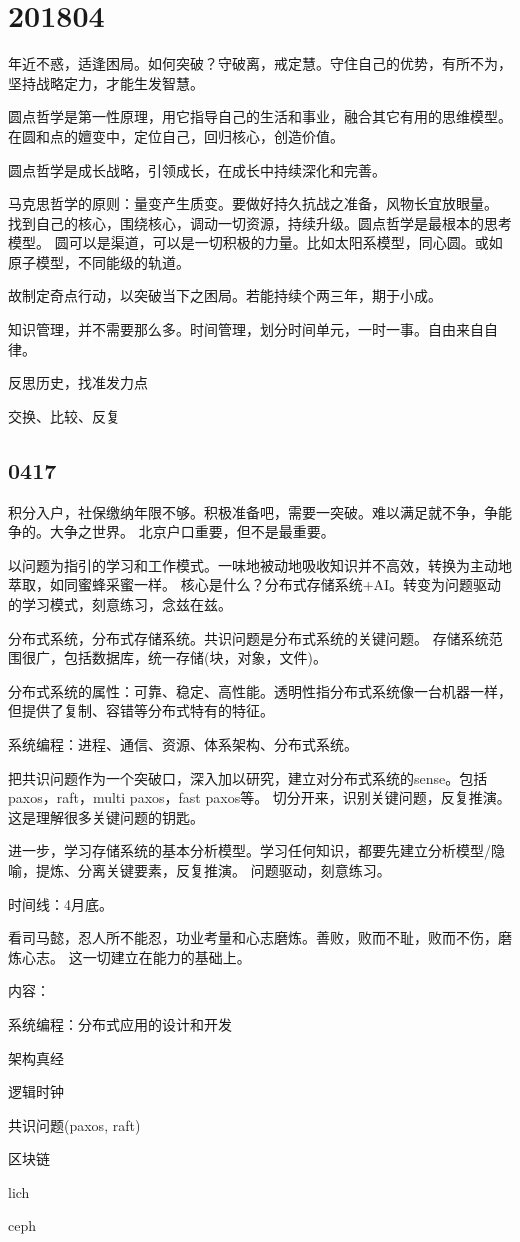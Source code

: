 \section{201804}

年近不惑，适逢困局。如何突破？守破离，戒定慧。守住自己的优势，有所不为，
坚持战略定力，才能生发智慧。

圆点哲学是第一性原理，用它指导自己的生活和事业，融合其它有用的思维模型。
在圆和点的嬗变中，定位自己，回归核心，创造价值。

圆点哲学是成长战略，引领成长，在成长中持续深化和完善。

马克思哲学的原则：量变产生质变。要做好持久抗战之准备，风物长宜放眼量。
找到自己的核心，围绕核心，调动一切资源，持续升级。圆点哲学是最根本的思考模型。
圆可以是渠道，可以是一切积极的力量。比如太阳系模型，同心圆。或如原子模型，不同能级的轨道。

故制定奇点行动，以突破当下之困局。若能持续个两三年，期于小成。

知识管理，并不需要那么多。时间管理，划分时间单元，一时一事。自由来自自律。

\begin{compactenum}
\item 反思历史，找准发力点
\item 交换、比较、反复
\end{compactenum}

\subsection{0417}

积分入户，社保缴纳年限不够。积极准备吧，需要一突破。难以满足就不争，争能争的。大争之世界。
北京户口重要，但不是最重要。

以问题为指引的学习和工作模式。一味地被动地吸收知识并不高效，转换为主动地萃取，如同蜜蜂采蜜一样。
核心是什么？分布式存储系统+AI。转变为问题驱动的学习模式，刻意练习，念兹在兹。

分布式系统，分布式存储系统。共识问题是分布式系统的关键问题。
存储系统范围很广，包括数据库，统一存储(块，对象，文件)。

分布式系统的属性：可靠、稳定、高性能。透明性指分布式系统像一台机器一样，但提供了复制、容错等分布式特有的特征。

系统编程：进程、通信、资源、体系架构、分布式系统。

把共识问题作为一个突破口，深入加以研究，建立对分布式系统的sense。包括paxos，raft，multi paxos，fast paxos等。
切分开来，识别关键问题，反复推演。这是理解很多关键问题的钥匙。

进一步，学习存储系统的基本分析模型。学习任何知识，都要先建立分析模型/隐喻，提炼、分离关键要素，反复推演。
问题驱动，刻意练习。

时间线：4月底。

看司马懿，忍人所不能忍，功业考量和心志磨炼。善败，败而不耻，败而不伤，磨炼心志。
这一切建立在能力的基础上。

\begin{compactenum}
内容：
\item 系统编程：分布式应用的设计和开发
\item 架构真经
\item 逻辑时钟
\item 共识问题(paxos, raft)
\item 区块链
\item lich
\item ceph
\end{compactenum}
